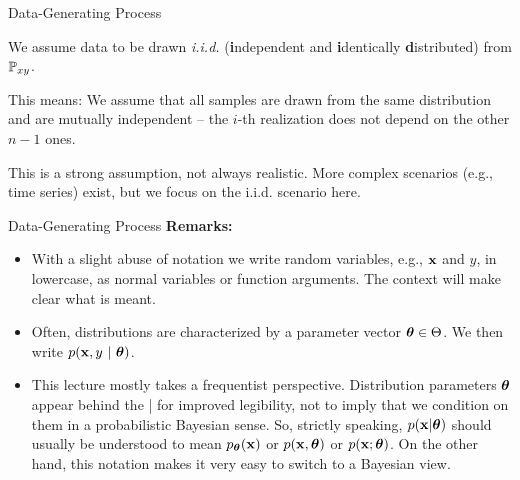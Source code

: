 \documentclass[11pt,compress,t,notes=noshow, xcolor=table]{beamer}
\begin{document}
\begin{framei}{Data-Generating Process}
\item We assume data to be drawn \emph{i.i.d.} (\textbf{i}ndependent and \textbf{i}dentically \textbf{d}istributed) from $\mathbb{P}_{xy}$.
\item This means: We assume that all samples are drawn from the same distribution and are mutually independent -- the $i$-th realization does not depend on the other $n-1$ ones.
\item This is a strong assumption, not always realistic.
More complex scenarios (e.g., time series) exist, but we focus on the i.i.d. scenario here. 
\vfill
{}
{
}
\end{framei}


\begin{frame2}{Data-Generating Process}
\textbf{Remarks:}
\begin{itemize}
  \item With a slight abuse of notation we write random variables, e.g., $\mathbf{x}$ and $y$, in lowercase, as normal variables or function arguments. 
  The context will make clear what is meant.
  \item Often, distributions are characterized by a parameter vector $\bm{\theta} \in \Theta$. We then write $p(\mathbf{x}, y ~|~ \bm{\theta})$.
  \item This lecture mostly takes a frequentist perspective. Distribution parameters $\bm{\theta}$ appear behind the | for improved legibility, not to imply that we condition on them in a probabilistic Bayesian sense.
  So, strictly speaking, $p(\mathbf{x} | \bm{\theta})$ should usually be understood to mean $p_{\bm{\theta}}(\mathbf{x})$ or $p(\mathbf{x}, \bm{\theta})$ or $p(\mathbf{x}; \bm{\theta})$.
  On the other hand, this notation makes it very easy to switch to a Bayesian view.
\end{itemize}
\end{frame2}

\endlecture
\end{document}
